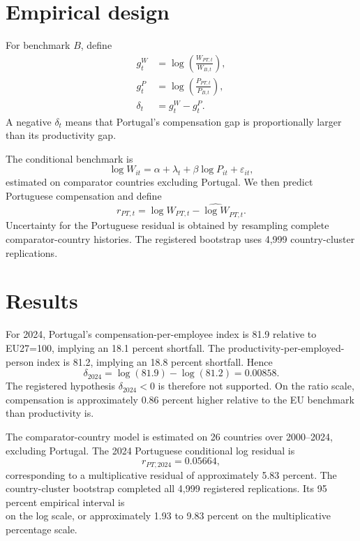 \documentclass[11pt,a4paper]{article}
\begin{document}
\section{Empirical design}
For benchmark $B$, define
\begin{align}
 g^W_t &= \log\left(\frac{W_{PT,t}}{W_{B,t}}\right),\\
 g^P_t &= \log\left(\frac{P_{PT,t}}{P_{B,t}}\right),\\
 \delta_t &= g^W_t-g^P_t.
\end{align}
A negative $\delta_t$ means that Portugal's compensation gap is proportionally larger than its productivity gap.

The conditional benchmark is
\begin{equation}
\log W_{it}=\alpha+\lambda_t+\beta\log P_{it}+\varepsilon_{it},
\end{equation}
estimated on comparator countries excluding Portugal. We then predict Portuguese compensation and define
\begin{equation}
r_{PT,t}=\log W_{PT,t}-\widehat{\log W}_{PT,t}.
\end{equation}
Uncertainty for the Portuguese residual is obtained by resampling complete comparator-country histories. The registered bootstrap uses 4,999 country-cluster replications.

\section{Results}
For 2024, Portugal's compensation-per-employee index is 81.9 relative to EU27=100, implying an 18.1 percent shortfall. The productivity-per-employed-person index is 81.2, implying an 18.8 percent shortfall. Hence
\begin{equation}
\delta_{2024}
=\log(81.9)-\log(81.2)
=0.00858.
\end{equation}
The registered hypothesis $\delta_{2024}<0$ is therefore not supported. On the ratio scale, compensation is approximately 0.86 percent higher relative to the EU benchmark than productivity is.

The comparator-country model is estimated on 26 countries over 2000--2024, excluding Portugal. The 2024 Portuguese conditional log residual is
\begin{equation}
r_{PT,2024}=0.05664,
\end{equation}
corresponding to a multiplicative residual of approximately 5.83 percent. The country-cluster bootstrap completed all 4,999 registered replications. Its 95 percent empirical interval is
\begin{equation}
[0.01913,\;0.09374]
\end{equation}
on the log scale, or approximately 1.93 to 9.83 percent on the multiplicative percentage scale.
\end{document}
